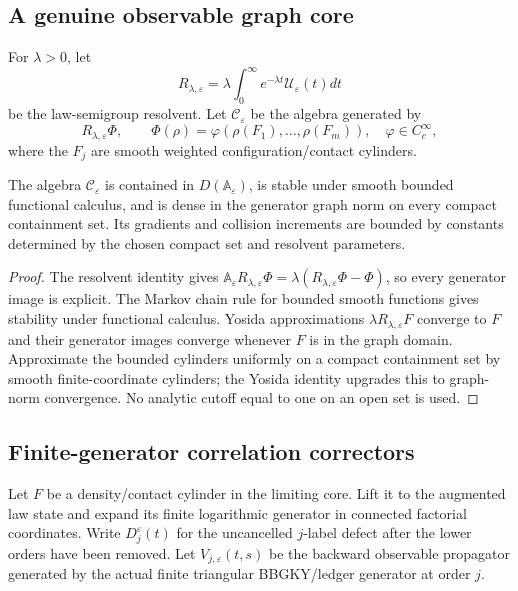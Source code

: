 \subsection{A genuine observable graph core}

For $\lambda>0$, let
\[
 R_{\lambda,\varepsilon}=\lambda\int_0^\infty e^{-\lambda t}
  \mathscr U_\varepsilon(t)dt
\]
be the law-semigroup resolvent.  Let $\mathscr C_\varepsilon$ be the algebra
generated by
\[
 R_{\lambda,\varepsilon}\Phi,
 \qquad
 \Phi(\rho)=\varphi(\rho(F_1),\ldots,\rho(F_m)),
 \quad \varphi\in C_c^\infty,
\]
where the $F_j$ are smooth weighted configuration/contact cylinders.

\begin{lemma}
\label{lem:r9-b4-core}
The algebra $\mathscr C_\varepsilon$ is contained in
$D(\mathbb A_\varepsilon)$, is stable under smooth bounded functional
calculus, and is dense in the generator graph norm on every compact
containment set.  Its gradients and collision increments are bounded by
constants determined by the chosen compact set and resolvent parameters.
\end{lemma}

\begin{proof}
The resolvent identity gives
$\mathbb A_\varepsilon R_{\lambda,\varepsilon}\Phi
=\lambda(R_{\lambda,\varepsilon}\Phi-\Phi)$, so every generator image is
explicit.  The Markov chain rule for bounded smooth functions gives stability
under functional calculus.  Yosida approximations
$\lambda R_{\lambda,\varepsilon}F$ converge to $F$ and their generator images
converge whenever $F$ is in the graph domain.  Approximate the bounded
cylinders uniformly on a compact containment set by smooth finite-coordinate
cylinders; the Yosida identity upgrades this to graph-norm convergence.  No
analytic cutoff equal to one on an open set is used.
\end{proof}

\subsection{Finite-generator correlation correctors}

Let $F$ be a density/contact cylinder in the limiting core.  Lift it to the
augmented law state and expand its finite logarithmic generator in connected
factorial coordinates.  Write $D_j^\varepsilon(t)$ for the uncancelled
$j$-label defect after the lower orders have been removed.  Let
$V_{j,\varepsilon}(t,s)$ be the backward observable propagator generated by
the actual finite triangular BBGKY/ledger generator at order $j$.

